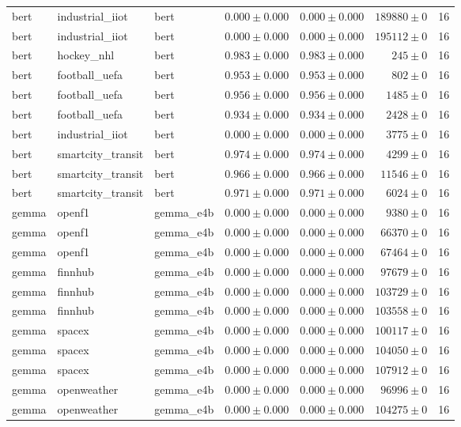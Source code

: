 \begin{table}[htbp]
\begin{tabular}{l l l r r r r}
bert & industrial\_iiot & bert & $0.000\pm0.000$ & $0.000\pm0.000$ & $189880\pm0$ & 16 \\
bert & industrial\_iiot & bert & $0.000\pm0.000$ & $0.000\pm0.000$ & $195112\pm0$ & 16 \\
bert & hockey\_nhl & bert & $0.983\pm0.000$ & $0.983\pm0.000$ & $245\pm0$ & 16 \\
bert & football\_uefa & bert & $0.953\pm0.000$ & $0.953\pm0.000$ & $802\pm0$ & 16 \\
bert & football\_uefa & bert & $0.956\pm0.000$ & $0.956\pm0.000$ & $1485\pm0$ & 16 \\
bert & football\_uefa & bert & $0.934\pm0.000$ & $0.934\pm0.000$ & $2428\pm0$ & 16 \\
bert & industrial\_iiot & bert & $0.000\pm0.000$ & $0.000\pm0.000$ & $3775\pm0$ & 16 \\
bert & smartcity\_transit & bert & $0.974\pm0.000$ & $0.974\pm0.000$ & $4299\pm0$ & 16 \\
bert & smartcity\_transit & bert & $0.966\pm0.000$ & $0.966\pm0.000$ & $11546\pm0$ & 16 \\
bert & smartcity\_transit & bert & $0.971\pm0.000$ & $0.971\pm0.000$ & $6024\pm0$ & 16 \\
gemma & openf1 & gemma\_e4b & $0.000\pm0.000$ & $0.000\pm0.000$ & $9380\pm0$ & 16 \\
gemma & openf1 & gemma\_e4b & $0.000\pm0.000$ & $0.000\pm0.000$ & $66370\pm0$ & 16 \\
gemma & openf1 & gemma\_e4b & $0.000\pm0.000$ & $0.000\pm0.000$ & $67464\pm0$ & 16 \\
gemma & finnhub & gemma\_e4b & $0.000\pm0.000$ & $0.000\pm0.000$ & $97679\pm0$ & 16 \\
gemma & finnhub & gemma\_e4b & $0.000\pm0.000$ & $0.000\pm0.000$ & $103729\pm0$ & 16 \\
gemma & finnhub & gemma\_e4b & $0.000\pm0.000$ & $0.000\pm0.000$ & $103558\pm0$ & 16 \\
gemma & spacex & gemma\_e4b & $0.000\pm0.000$ & $0.000\pm0.000$ & $100117\pm0$ & 16 \\
gemma & spacex & gemma\_e4b & $0.000\pm0.000$ & $0.000\pm0.000$ & $104050\pm0$ & 16 \\
gemma & spacex & gemma\_e4b & $0.000\pm0.000$ & $0.000\pm0.000$ & $107912\pm0$ & 16 \\
gemma & openweather & gemma\_e4b & $0.000\pm0.000$ & $0.000\pm0.000$ & $96996\pm0$ & 16 \\
gemma & openweather & gemma\_e4b & $0.000\pm0.000$ & $0.000\pm0.000$ & $104275\pm0$ & 16 \\

\end{tabular}
\end{table}
